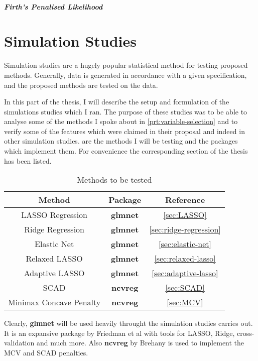 \subsubsection{Firth's Penalised Likelihood}

\fi
\newpage
\part{Simulation Studies}

Simulation studies are a hugely popular statistical method for testing proposed methods. Generally, data is generated in accordance with a given specification, and the proposed methods are tested on the data. 

In this part of the thesis, I will describe the setup and formulation of the simulations studies which I ran. The purpose of these studies was to be able to analyse some of the methods I spoke about in \cref{prt:variable-selection} and to verify some of the features which were claimed in their proposal and indeed in other simulation studies.  are the methods I will be testing and the packages which implement them. For convenience the corresponding section of the thesis has been listed.

\begin{table}[hb]
\centering
\begin{tabular}{|c|c|c|}
    \hline
    \textbf{Method} & \textbf{Package} & \textbf{Reference}\\
    \hline
    LASSO Regression & \textbf{glmnet} & \cref{sec:LASSO}\\
    Ridge Regression & \textbf{glmnet} & \cref{sec:ridge-regression}\\
    Elastic Net & \textbf{glmnet} & \cref{sec:elastic-net}\\
    Relaxed LASSO & \textbf{glmnet} & \cref{sec:relaxed-lasso}\\
    Adaptive LASSO & \textbf{glmnet} & \cref{sec:adaptive-lasso}\\
    SCAD & \textbf{ncvreg} & \cref{sec:SCAD}\\
    Minimax Concave Penalty & \textbf{ncvreg} & \cref{sec:MCV}\\
    \hline
\end{tabular}\caption{Methods to be tested}\label{tbl:methods-to-be-tested}
\end{table}

Clearly, \textbf{glmnet} will be used heavily throught the simulation studies carries out. It is an expansive package by Friedman et al  with tools for LASSO, Ridge, cross-validation and much more. Also \textbf{ncvreg} by Brehany  is used to implement the MCV and SCAD penalties. 

